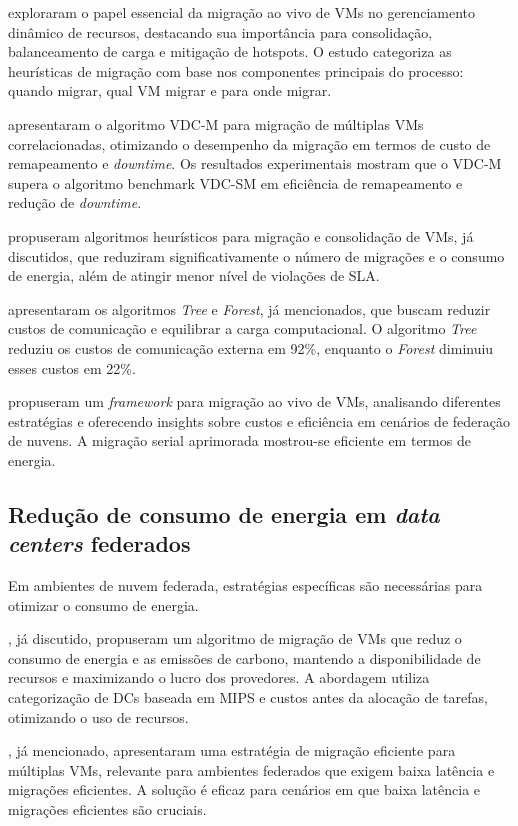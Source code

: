 \documentclass[
	12pt,				%
	oneside,			%
	a4paper,			%
	english,			%
	brazil				%
	]{abntex2ppgsi}
\begin{document}
 exploraram o papel essencial da migração ao vivo de VMs no gerenciamento dinâmico de recursos, destacando sua importância para consolidação, balanceamento de carga e mitigação de hotspots. O estudo categoriza as heurísticas de migração com base nos componentes principais do processo: quando migrar, qual VM migrar e para onde migrar.

 apresentaram o algoritmo VDC-M para migração de múltiplas VMs correlacionadas, otimizando o desempenho da migração em termos de custo de remapeamento e \textit{downtime}. Os resultados experimentais mostram que o VDC-M supera o algoritmo benchmark VDC-SM em eficiência de remapeamento e redução de \textit{downtime}.

 propuseram algoritmos heurísticos para migração e consolidação de VMs, já discutidos, que reduziram significativamente o número de migrações e o consumo de energia, além de atingir menor nível de violações de SLA.

 apresentaram os algoritmos \textit{Tree} e \textit{Forest}, já mencionados, que buscam reduzir custos de comunicação e equilibrar a carga computacional. O algoritmo \textit{Tree} reduziu os custos de comunicação externa em 92\%, enquanto o \textit{Forest} diminuiu esses custos em 22\%.

 propuseram um \textit{framework} para migração ao vivo de VMs, analisando diferentes estratégias e oferecendo insights sobre custos e eficiência em cenários de federação de nuvens. A migração serial aprimorada mostrou-se eficiente em termos de energia.

\subsection{Redução de consumo de energia em \textit{data centers} federados}

Em ambientes de nuvem federada, estratégias específicas são necessárias para otimizar o consumo de energia.

, já discutido, propuseram um algoritmo de migração de VMs que reduz o consumo de energia e as emissões de carbono, mantendo a disponibilidade de recursos e maximizando o lucro dos provedores. A abordagem utiliza categorização de DCs baseada em MIPS e custos antes da alocação de tarefas, otimizando o uso de recursos.

, já mencionado, apresentaram uma estratégia de migração eficiente para múltiplas VMs, relevante para ambientes federados que exigem baixa latência e migrações eficientes. A solução é eficaz para cenários em que baixa latência e migrações eficientes são cruciais.
\end{document}
